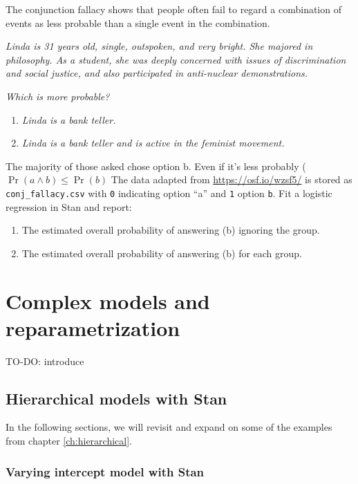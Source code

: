 \documentclass[12pt,]{krantz}
\providecommand{\tightlist}{%
  \setlength{\itemsep}{0pt}\setlength{\parskip}{0pt}}
\theoremstyle{definition}
\theoremstyle{definition}
\theoremstyle{definition}
\theoremstyle{remark}
\begin{document}
The conjunction fallacy shows that people often fail to regard a
combination of events as less probable than a single event in the
combination. \citet{TverskyKahneman1983}

\emph{Linda is 31 years old, single, outspoken, and very bright. She
majored in philosophy. As a student, she was deeply concerned with
issues of discrimination and social justice, and also participated in
anti-nuclear demonstrations.}

\emph{Which is more probable?}

\begin{enumerate}
\def\labelenumi{\alph{enumi}.}
\tightlist
\item
  \emph{Linda is a bank teller.}
\item
  \emph{Linda is a bank teller and is active in the feminist movement.}
\end{enumerate}

The majority of those asked chose option b. Even if it's less probably
(\(\Pr(a\land b)\leq \Pr(b)\) The data adapted from
\url{https://osf.io/wzsf5/} is stored as \texttt{conj\_fallacy.csv} with
\texttt{0} indicating option ``a'' and \texttt{1} option \texttt{b}. Fit
a logistic regression in Stan and report:

\begin{enumerate}
\def\labelenumi{\alph{enumi}.}
\tightlist
\item
  The estimated overall probability of answering (b) ignoring the group.
\item
  The estimated overall probability of answering (b) for each group.
\end{enumerate}

\chapter{Complex models and reparametrization}\label{ch:complexstan}

TO-DO: introduce

\section{Hierarchical models with
Stan}\label{hierarchical-models-with-stan}

In the following sections, we will revisit and expand on some of the
examples from chapter \ref{ch:hierarchical}.

\subsection{Varying intercept model with
Stan}\label{varying-intercept-model-with-stan}
\end{document}
